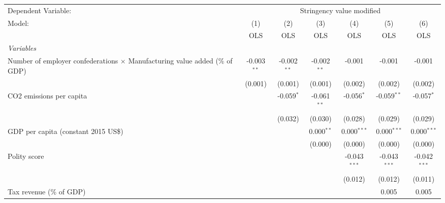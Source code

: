 
\begingroup
\centering
\begin{tabular}{lcccccc}
   \toprule
   Dependent Variable: & \multicolumn{6}{c}{Stringency value modified}\\
   Model:                                                                             & (1)           & (2)           & (3)           & (4)            & (5)            & (6)\\  
                                                                                      &  OLS          & OLS           & OLS           & OLS            & OLS            & OLS\\  
   \midrule
   \emph{Variables}\\
   Number of employer confederations $\times$ Manufacturing value added (\% of GDP)   & -0.003$^{**}$ & -0.002$^{**}$ & -0.002$^{**}$ & -0.001         & -0.001         & -0.001\\   
                                                                                      & (0.001)       & (0.001)       & (0.001)       & (0.002)        & (0.002)        & (0.002)\\   
   CO2 emissions per capita                                                           &               & -0.059$^{*}$  & -0.061$^{**}$ & -0.056$^{*}$   & -0.059$^{**}$  & -0.057$^{*}$\\   
                                                                                      &               & (0.032)       & (0.030)       & (0.028)        & (0.029)        & (0.029)\\   
   GDP per capita (constant 2015 US\$)                                                &               &               & 0.000$^{**}$  & 0.000$^{***}$  & 0.000$^{***}$  & 0.000$^{***}$\\   
                                                                                      &               &               & (0.000)       & (0.000)        & (0.000)        & (0.000)\\   
   Polity score                                                                       &               &               &               & -0.043$^{***}$ & -0.043$^{***}$ & -0.042$^{***}$\\   
                                                                                      &               &               &               & (0.012)        & (0.012)        & (0.011)\\   
   Tax revenue (\% of GDP)                                                            &               &               &               &                & 0.005          & 0.005\\   

\end{tabular}
